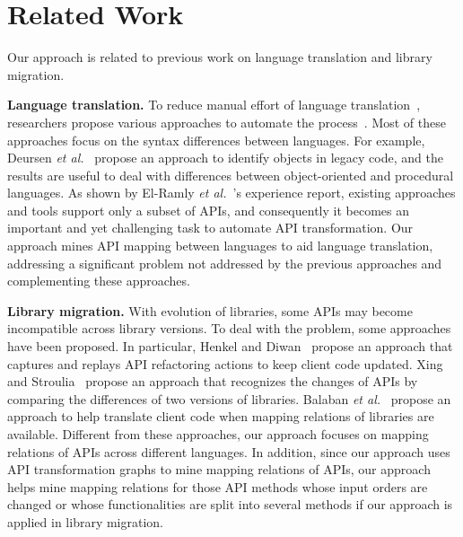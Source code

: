 \section{Related Work}
\label{sec:related}

Our approach is related to previous work on
language translation and library migration.

\textbf{Language translation.} To reduce manual effort of language
translation~\cite{samet1981experience}, researchers propose various
approaches to automate the
process~\cite{hassan2005lightweight,van1999identifying,waters1988program,mossienko2003automated,yasumatsu1995spice}.
Most of these approaches focus on the syntax differences between
languages. For example, Deursen \emph{et
al.}~\cite{van1999identifying} propose an approach to identify
objects in legacy code, and the results are useful to deal with
differences between object-oriented and procedural languages. As
shown by El-Ramly \emph{et al.}~\cite{el2006experiment}'s experience
report, existing approaches and tools support only a subset of APIs,
and consequently it becomes an important and yet challenging task to
automate API transformation. Our approach mines API mapping between
languages to aid language translation, addressing a significant
problem not addressed by the previous approaches and complementing
these approaches.

\textbf{Library migration.} With evolution of libraries, some APIs
may become incompatible across library versions. To deal with the
problem, some approaches have been proposed. In particular, Henkel
and Diwan~\cite{henkel2005catchup} propose an approach that captures
and replays API refactoring actions to keep client code updated.
Xing and Stroulia~\cite{xing2007api} propose an approach that
recognizes the changes of APIs by comparing the differences of two
versions of libraries. Balaban \emph{et
al.}~\cite{balaban2005refactoring} propose an approach to help
translate client code when mapping relations of libraries are
available. Different from these approaches, our approach focuses on
mapping relations of APIs across different languages. In addition, since
our approach uses API transformation graphs to mine mapping
relations of APIs, our approach helps mine mapping relations for
those API methods whose input orders are changed or whose
functionalities are split into several methods if our approach is
applied in library migration.
